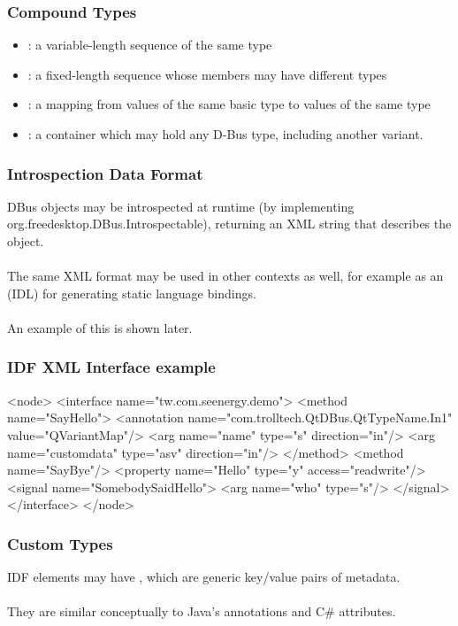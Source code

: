 \documentclass[xcolor=dvipsnames,compress]{beamer}
\begin{document}
\begin{frame}
    \frametitle{Compound Types}
    \begin{itemize}
    \item {}: a variable-length sequence of the same type 
    \item {}: a fixed-length sequence whose members may have different types
    \item {}: a mapping from values of the same basic type to values of the same type 
    \item {}: a container which may hold any D-Bus type, including another variant.
    \end{itemize}
\end{frame}
\begin{frame}
    \frametitle{Introspection Data Format}
    DBus objects may be introspected at runtime (by implementing org.freedesktop.DBus.Introspectable), returning an XML string that describes the object.\\~\\ 
    The same XML format may be used in other contexts as well, for example as an  (IDL) for generating static language bindings.\\~\\
    An example of this is shown later.
\end{frame}
\begin{frame}[fragile]
    \frametitle{IDF XML Interface example}
    \begin{xmlcode}
    <node>
        <interface name="tw.com.seenergy.demo">
            <method name="SayHello">
                <annotation name="com.trolltech.QtDBus.QtTypeName.In1" value="QVariantMap"/>
                <arg name="name" type="s" direction="in"/>
                <arg name="customdata" type="a{sv}" direction="in"/>
            </method>
            <method name="SayBye"/>
            <property name="Hello" type="y" access="readwrite"/>
            <signal name="SomebodySaidHello">
                <arg name="who" type="s"/>
            </signal>
        </interface>
    </node>
    \end{xmlcode}
\end{frame}

\begin{frame}
    \frametitle{Custom Types}
    IDF elements may have , which are generic key/value pairs of metadata.\\~\\
    They are similar conceptually to Java's annotations and C\# attributes.
\end{frame}
\end{document}
